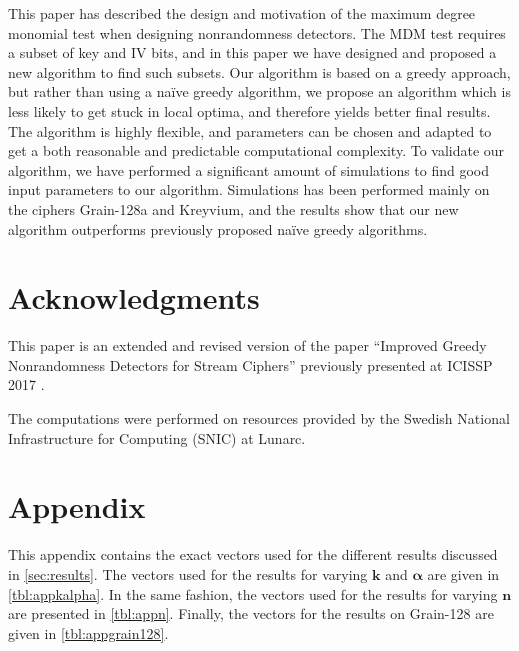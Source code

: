 {This paper has described the design and motivation of the maximum degree monomial test when designing nonrandomness detectors. The MDM test requires a subset of key and IV bits, and in this paper we have designed and proposed a new algorithm to find such subsets. Our algorithm is based on a greedy approach, but rather than using a na\"{i}ve greedy algorithm, we propose an algorithm which is less likely to get stuck in local optima, and therefore yields better final results. The algorithm is highly flexible, and parameters can be chosen and adapted to get a both reasonable and predictable computational complexity. To validate our algorithm, we have performed a significant amount of simulations to find good input parameters to our algorithm. Simulations has been performed mainly on the ciphers Grain-128a and Kreyvium, and the results show that our new algorithm outperforms previously proposed na\"{i}ve greedy algorithms.

\section*{Acknowledgments}
This paper is an extended and revised version of the paper ``Improved Greedy Nonrandomness Detectors for Stream Ciphers'' previously presented at ICISSP 2017 \cite{karlsson:2017}.

The computations were performed on resources provided by the Swedish National Infrastructure for Computing (SNIC) at Lunarc.

%

{\raggedright
	\printbibliography[segment=\therefsegment,heading=subbibliography]
}

\section*{Appendix}%
%

This appendix contains the exact vectors used for the different results discussed in \autoref{sec:results}. The vectors used for the results for varying $\bm{k}$ and $\bm{\alpha}$ are given in \autoref{tbl:appkalpha}. In the same fashion, the vectors used for the results for varying $\bm{n}$ are presented in \autoref{tbl:appn}. Finally, the vectors for the results on Grain-128 are given in \autoref{tbl:appgrain128}.

}
